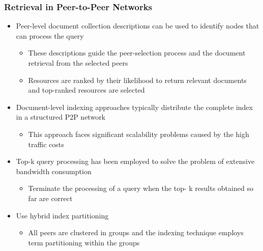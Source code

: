 \documentclass{beamer}
\begin{document}
\begin{frame}[allowframebreaks]
    \frametitle{Retrieval in Peer-to-Peer Networks}
    \begin{itemize}
    \item Peer-level document collection descriptions can be used to identify
        nodes that can process the query
        \begin{itemize}
        \item These descriptions guide the peer-selection process and the
            document retrieval from the selected peers
        \item Resources are ranked by their likelihood to return relevant
            documents and top-ranked resources are selected
        \end{itemize}
    \item Document-level indexing approaches typically distribute the complete
        index in a structured P2P network
        \begin{itemize}
        \item This approach faces significant scalability problems caused by
            the high traffic costs
        \end{itemize}
\pagebreak
    \item Top-k query processing has been employed to solve the problem of
        extensive bandwidth consumption
        \begin{itemize}
        \item Terminate the processing of a query when the top- k results
            obtained so far are correct
        \end{itemize}
    \item Use hybrid index partitioning
        \begin{itemize}
        \item All peers are clustered in groups and the indexing technique
            employs term partitioning within the groups
        \end{itemize}
    \end{itemize}
\end{frame}


\end{document}
